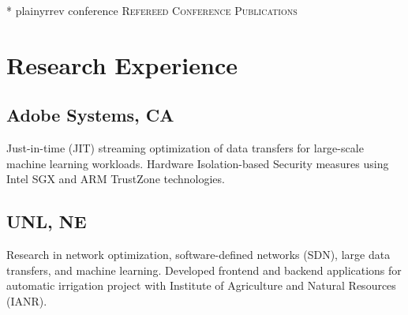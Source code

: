 \documentclass[11pt,a4paper,sans]{moderncv}        %
\newcommand\Colorhref[3][orange]{\href{#2}{\small\color{#1}#3}}
\begin{document}
\nocite{conference}{*}
{plainyrrev}
{conference}
{\large \textsc{Refereed Conference Publications}}















\section{Research Experience}
\subsection{Adobe Systems, CA}
{Just-in-time (JIT) streaming optimization of data transfers for large-scale machine learning workloads.
}
{Hardware Isolation-based  Security measures using Intel SGX and ARM TrustZone technologies.
}
\subsection{UNL, NE}
{Research in network optimization, software-defined networks (SDN), large data transfers, and machine learning. 
}
{Developed frontend and backend applications for automatic irrigation project with Institute of Agriculture and Natural Resources (IANR). 
}

\end{document}
